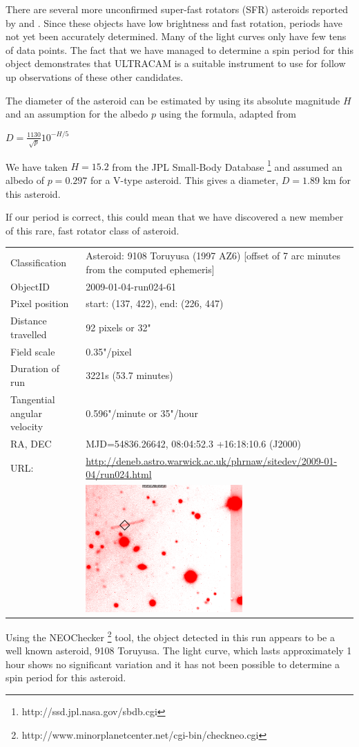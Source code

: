   There are several more unconfirmed super-fast rotators (SFR) asteroids reported by \cite{Masiero2009} and \cite{Dermawan2011}. Since these objects have low brightness and fast rotation, periods have not yet been accurately determined. Many of the light curves only have few tens of data points. The fact that we have managed to determine a spin period for this object demonstrates that ULTRACAM is a suitable instrument to use for follow up observations of these other candidates.  

  The diameter of the asteroid can be estimated by using its absolute magnitude $H$ and an assumption for the albedo $p$ using the formula, adapted from \cite{Jewitt2013}

  $D = \frac{1130}{\sqrt{p}}10^{-H/5} $

  We have taken $H = 15.2$ from the JPL Small-Body Database \footnote{http://ssd.jpl.nasa.gov/sbdb.cgi} and assumed an albedo of $ p = 0.297$ for a V-type asteroid. This gives a diameter, $D = 1.89$ km for this asteroid. 

  If our period is correct, this could mean that we have discovered a new member of this rare, fast rotator class of asteroid. 

  \newpage

  \begin{tabular}{l l}
  Classification & Asteroid: 9108 Toruyusa (1997 AZ6) [offset of 7 arc minutes from the computed ephemeris]\\
  ObjectID & 2009-01-04-run024-61 \\
  Pixel position & start: (137, 422), end: (226, 447) \\
  Distance travelled & 92 pixels or 32" \\
  Field scale & 0.35"/pixel \\
  Duration of run & 3221s (53.7 minutes) \\
  Tangential angular velocity & 0.596"/minute or 35"/hour\\ 
  RA, DEC & MJD=54836.26642, 08:04:52.3 +16:18:10.6 (J2000) \\
  URL: & \small \url{http://deneb.astro.warwick.ac.uk/phrnaw/sitedev/2009-01-04/run024.html} \\
       & \includegraphics[width=60mm]{images/2009-01-04-run024-61.png} \\
  \end{tabular}

  Using the NEOChecker \footnote{http://www.minorplanetcenter.net/cgi-bin/checkneo.cgi} tool, the object detected in this run appears to be a well known asteroid, 9108 Toruyusa. The light curve, which lasts approximately 1 hour shows no significant variation and it has not been possible to determine a spin period for this asteroid.  

  
